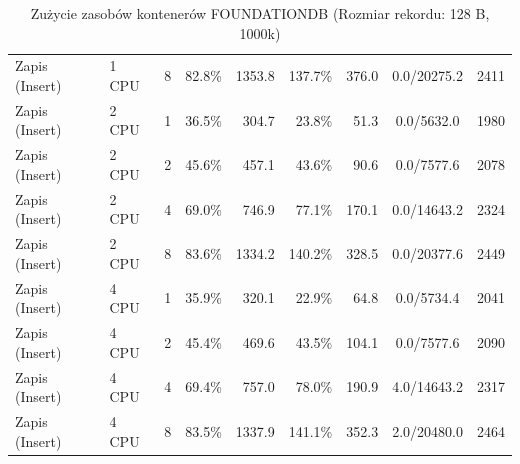 \begin{table}[ht]
{\begin{tabular}{llcrrrrcc}
Zapis (Insert) & 1 CPU & 8 & 82.8\% & 1353.8 & 137.7\% & 376.0 & 0.0/20275.2 & 2411 \\
Zapis (Insert) & 2 CPU & 1 & 36.5\% & 304.7 & 23.8\% & 51.3 & 0.0/5632.0 & 1980 \\
Zapis (Insert) & 2 CPU & 2 & 45.6\% & 457.1 & 43.6\% & 90.6 & 0.0/7577.6 & 2078 \\
Zapis (Insert) & 2 CPU & 4 & 69.0\% & 746.9 & 77.1\% & 170.1 & 0.0/14643.2 & 2324 \\
Zapis (Insert) & 2 CPU & 8 & 83.6\% & 1334.2 & 140.2\% & 328.5 & 0.0/20377.6 & 2449 \\
Zapis (Insert) & 4 CPU & 1 & 35.9\% & 320.1 & 22.9\% & 64.8 & 0.0/5734.4 & 2041 \\
Zapis (Insert) & 4 CPU & 2 & 45.4\% & 469.6 & 43.5\% & 104.1 & 0.0/7577.6 & 2090 \\
Zapis (Insert) & 4 CPU & 4 & 69.4\% & 757.0 & 78.0\% & 190.9 & 4.0/14643.2 & 2317 \\
Zapis (Insert) & 4 CPU & 8 & 83.5\% & 1337.9 & 141.1\% & 352.3 & 2.0/20480.0 & 2464 \\
\bottomrule
\end{tabular}%
}
\caption{Zużycie zasobów kontenerów FOUNDATIONDB (Rozmiar rekordu: 128 B, 1000k)}
\label{tab:resources_foundationdb_small_1000000}
\end{table}
